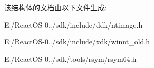 该结构体的文档由以下文件生成\+:\begin{DoxyCompactItemize}
\item 
E\+:/\+React\+O\+S-\/0../sdk/include/ddk/ntimage.\+h\item 
E\+:/\+React\+O\+S-\/0../sdk/include/xdk/winnt\+\_\+old.\+h\item 
E\+:/\+React\+O\+S-\/0../sdk/tools/rsym/rsym64.\+h\end{DoxyCompactItemize}

